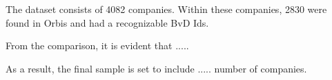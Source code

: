 \documentclass[12pt,a4paper]{article}
\begin{document}

The dataset consists of 4082 companies. Within these companies, 2830 were found in Orbis and had a recognizable BvD Ids.   

From the comparison, it is evident that .....

As a result, the final sample is set to include ..... number of companies. 
\end{document}
